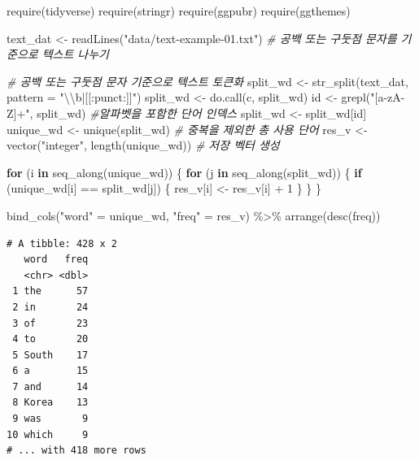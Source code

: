 \documentclass[
  11pt,
]{krantz}
\newenvironment{Shaded}{\begin{snugshade}}{\end{snugshade}}
\newcommand{\AttributeTok}[1]{\textcolor[rgb]{0.61,0.61,0.61}{#1}}
\newcommand{\CommentTok}[1]{\textcolor[rgb]{0.37,0.37,0.37}{\textit{#1}}}
\newcommand{\ControlFlowTok}[1]{\textcolor[rgb]{0.27,0.27,0.27}{\textbf{#1}}}
\newcommand{\DecValTok}[1]{\textcolor[rgb]{0.06,0.06,0.06}{#1}}
\newcommand{\FunctionTok}[1]{\textcolor[rgb]{0,0,0}{#1}}
\newcommand{\NormalTok}[1]{#1}
\newcommand{\OtherTok}[1]{\textcolor[rgb]{0.37,0.37,0.37}{#1}}
\newcommand{\SpecialCharTok}[1]{\textcolor[rgb]{0,0,0}{#1}}
\newcommand{\StringTok}[1]{\textcolor[rgb]{0.5,0.5,0.5}{#1}}
\begin{document}
\footnotesize

\begin{Shaded}
\begin{Highlighting}[]
\FunctionTok{require}\NormalTok{(tidyverse)}
\FunctionTok{require}\NormalTok{(stringr)}
\FunctionTok{require}\NormalTok{(ggpubr)}
\FunctionTok{require}\NormalTok{(ggthemes)}

\NormalTok{text\_dat }\OtherTok{\textless{}{-}} \FunctionTok{readLines}\NormalTok{(}\StringTok{"data/text{-}example{-}01.txt"}\NormalTok{)}
\CommentTok{\# 공백 또는 구둣점 문자를 기준으로 텍스트 나누기}

\CommentTok{\# 공백 또는 구둣점 문자 기준으로 텍스트 토큰화}
\NormalTok{split\_wd }\OtherTok{\textless{}{-}} \FunctionTok{str\_split}\NormalTok{(text\_dat, }\AttributeTok{pattern =} \StringTok{"}\SpecialCharTok{\textbackslash{}\textbackslash{}}\StringTok{b|[[:punct:]]"}\NormalTok{) }
\NormalTok{split\_wd }\OtherTok{\textless{}{-}} \FunctionTok{do.call}\NormalTok{(c, split\_wd)}
\NormalTok{id }\OtherTok{\textless{}{-}} \FunctionTok{grepl}\NormalTok{(}\StringTok{"[a{-}zA{-}Z]+"}\NormalTok{, split\_wd) }\CommentTok{\#알파벳을 포함한 단어 인덱스}
\NormalTok{split\_wd }\OtherTok{\textless{}{-}}\NormalTok{ split\_wd[id]}
\NormalTok{unique\_wd }\OtherTok{\textless{}{-}} \FunctionTok{unique}\NormalTok{(split\_wd) }\CommentTok{\# 중복을 제외한 총 사용 단어}
\NormalTok{res\_v }\OtherTok{\textless{}{-}} \FunctionTok{vector}\NormalTok{(}\StringTok{"integer"}\NormalTok{, }\FunctionTok{length}\NormalTok{(unique\_wd)) }\CommentTok{\# 저장 벡터 생성}

\ControlFlowTok{for}\NormalTok{ (i }\ControlFlowTok{in} \FunctionTok{seq\_along}\NormalTok{(unique\_wd)) \{}
  \ControlFlowTok{for}\NormalTok{ (j }\ControlFlowTok{in} \FunctionTok{seq\_along}\NormalTok{(split\_wd)) \{}
    \ControlFlowTok{if}\NormalTok{ (unique\_wd[i] }\SpecialCharTok{==}\NormalTok{ split\_wd[j]) \{}
\NormalTok{      res\_v[i] }\OtherTok{\textless{}{-}}\NormalTok{ res\_v[i] }\SpecialCharTok{+} \DecValTok{1} 
\NormalTok{    \}}
\NormalTok{  \}}
\NormalTok{\}}

\FunctionTok{bind\_cols}\NormalTok{(}\StringTok{"word"} \OtherTok{=}\NormalTok{ unique\_wd, }\StringTok{"freq"} \OtherTok{=}\NormalTok{ res\_v) }\SpecialCharTok{\%\textgreater{}\%} 
  \FunctionTok{arrange}\NormalTok{(}\FunctionTok{desc}\NormalTok{(freq)) }
\end{Highlighting}
\end{Shaded}

\begin{verbatim}
# A tibble: 428 x 2
   word   freq
   <chr> <dbl>
 1 the      57
 2 in       24
 3 of       23
 4 to       20
 5 South    17
 6 a        15
 7 and      14
 8 Korea    13
 9 was       9
10 which     9
# ... with 418 more rows
\end{verbatim}
\end{document}
